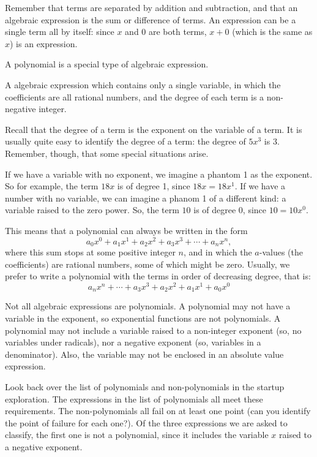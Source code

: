 Remember that terms are separated by addition and subtraction, and that an \gls{algebraic expression} is the sum or difference of terms. An expression can be a single term all by itself: since $x$ and $0$ are both terms, $x+0$ (which is the same as $x$) is an expression.

A \gls{polynomial} is a special type of algebraic expression.

\begin{boxdef}[Polynomial]
A algebraic expression which contains only a single variable, in which the coefficients are all rational numbers, and the degree of each term is a non-negative integer.
\end{boxdef}

Recall that the \gls{degree of a term} is the exponent on the variable of a term. It is usually quite easy to identify the degree of a term: the degree of $5x^3$ is 3. Remember, though, that some special situations arise.

If we have a variable with no exponent, we imagine a phantom 1 as the exponent. So for example, the term $18x$ is of degree 1, since $18x = 18x^1$. If we have a number with no variable, we can imagine a phanom 1 of a different kind: a variable raised to the zero power. So, the term $10$ is of degree 0, since $10 = 10x^0$.

This means that a polynomial can always be written in the form
\[a_0x^0 + a_1x^1 + a_2x^2 + a_3x^3+ \dotsb +a_nx^n,\]
where this sum stops at some positive integer $n$, and in which the $a$-values (the coefficients) are rational numbers, some of which might be zero. Usually, we prefer to write a polynomial with the terms in order of decreasing degree, that is:
\[a_nx^n + \dotsb + a_3x^3 + a_2x^2 + a_1x^1 + a_0x^0\]

Not all algebraic expressions are polynomials. A polynomial may not have a variable in the exponent, so exponential functions are not polynomials. A polynomial may not include a variable raised to a non-integer exponent (so, no variables under radicals), nor a negative exponent (so, variables in a denominator). Also, the variable may not be enclosed in an absolute value expression.

Look back over the list of polynomials and non-polynomials in the startup exploration. The expressions in the list of polynomials all meet these requirements. The non-polynomials all fail on at least one point (can you identify the point of failure for each one?). Of the three expressions we are asked to classify, the first one is not a polynomial, since it includes the variable $x$ raised to a negative exponent. 

